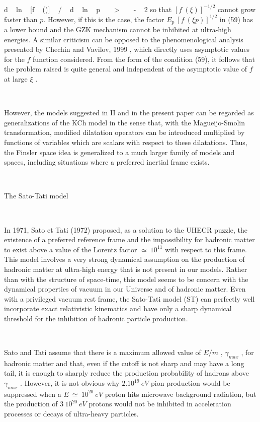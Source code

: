 \documentclass[a4paper,12pt,dvips]{article}
\makeatletter
\renewcommand{\section}{\@startsection{section}{1}{0in}
	{0.4\baselineskip}{0.1\baselineskip}{\Large\bf}}
\makeatother
\begin{document}
\equation 
d ~ ln ~ [f ~ (\xi )] ~ / ~ d ~ ln ~ p ~ ~ > ~ ~ - ~ 2
\endequation
\noindent
so that $[f ~ (\xi )]^{-1/2}$ cannot grow faster than $p$. However, if this is the case, the factor $ E_p ~ [f ~ (\xi p)]^{1/2}$ in (59) has a lower bound and the GZK mechanism cannot be inhibited at ultra-high energies. A similar criticism can be opposed to the phenomenological analysis presented by Chechin and Vavilov, 1999 , which directly uses asymptotic values for the $f$ function considered. From the form of the condition (59), it follows that the problem raised is quite general and independent of the asymptotic value of $f$ at large $\xi $ .

~ 

However, the models suggested in II and in the present paper can be regarded as generalizations of the KCh model in the sense that, with the Magueijo-Smolin transformation, modified dilatation operators can be introduced multiplied by functions of variables which are scalars with respect to these dilatations. Thus, the Finsler space idea is generalized to a much larger family of models and spaces, including situations where a preferred inertial frame exists.

~ 
~ 

\section{The Sato-Tati model}
\label{satotati.sec}

~ 

In 1971, Sato et Tati (1972) proposed, as a solution to the UHECR puzzle, the existence of a preferred reference frame and the impossibility for hadronic matter to exist above a value of the Lorentz factor $\simeq ~ 10^{11}$ with respect to this frame. This model involves a very strong dynamical assumption on the production of hadronic matter at ultra-high energy that is not present in our models. Rather than with the structure of space-time, this model seems to be concern with the dynamical properties of vacuum in our Universe and of hadronic matter. Even with a privileged vacuum rest frame, the Sato-Tati model (ST) can perfectly well incorporate exact relativistic kinematics and have only a sharp dynamical threshold for the inhibition of hadronic particle production.

~ 

Sato and Tati assume that there is a maximum allowed value of $E/m$ , $\gamma _ {max}$ , for hadronic matter and that, even if the cutoff is not sharp and may have a long tail, it is enough to sharply reduce the production probability of hadrons above $\gamma _ {max}$ . However, it is not obvious why $2. 10^{19} ~ eV $ pion production would be suppressed when a $E ~ \simeq ~ 10^{20} ~ eV$ proton hits microwave background radiation, but the production of $3 ~ 10^{20} ~ eV$ protons would not be inhibited in acceleration processes or decays of ultra-heavy particles.
\end{document}
